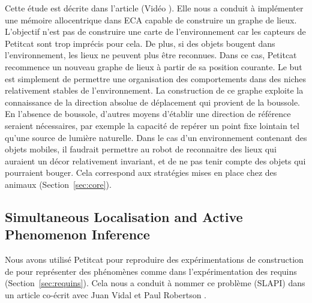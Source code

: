 Cette étude est décrite dans l'article  \cite{georgeon_spatio-temporal_2026} 
(Vidéo ).
Elle nous a conduit à implémenter une mémoire allocentrique dans ECA capable de construire un graphe de lieux. L'objectif n'est pas de construire une carte de l'environnement car les capteurs de Petitcat sont trop imprécis pour cela. 
De plus, si des objets bougent dans l'environnement, les lieux ne peuvent plus être reconnues. 
Dans ce cas, Petitcat recommence un nouveau graphe de lieux à partir de sa position courante. 
Le but est simplement de permettre une organisation des comportements dans des niches relativement stables de l'environnement. 
La construction de ce graphe exploite la connaissance de la direction absolue de déplacement qui provient de la boussole. 
En l'absence de boussole, d'autres moyens d'établir une direction de référence seraient nécessaires, par exemple la capacité de repérer un point fixe lointain tel qu'une source de lumière naturelle.
Dans le cas d'un environnement contenant des objets mobiles, il faudrait permettre au robot de reconnaitre des lieux qui auraient un décor relativement invariant, et de ne pas tenir compte des objets qui pourraient bouger. 
Cela correspond aux stratégies mises en place chez des animaux (Section~\ref{sec:core}).



\subsection{Simultaneous Localisation and Active Phenomenon Inference}
\label{sec:slapi}

\noindent
Nous avons utilisé Petitcat pour reproduire des expérimentations de construction de  pour représenter des phénomènes comme dans l'expérimentation des requins (Section~\ref{sec:requins}).
Cela nous a conduit à nommer ce problème  (SLAPI) dans un article co-écrit avec Juan Vidal et Paul Robertson  \cite{georgeon_simultaneous_2022}.

